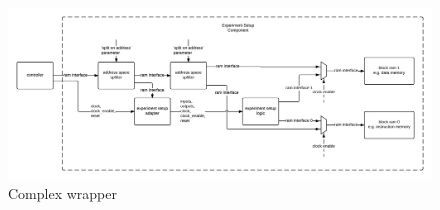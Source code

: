 \documentclass[openright]{uva-bachelor-thesis}
\begin{document}
\begin{landscape}
    \begin{figure}
        \centering
        \includegraphics[width=\hsize]{logic-wrap-extended}
        \caption{Complex wrapper}
        \label{fig:logic-wrap-extended}
    \end{figure}
\end{landscape}

\cleardoublepage


\printbibliography
\end{document}
